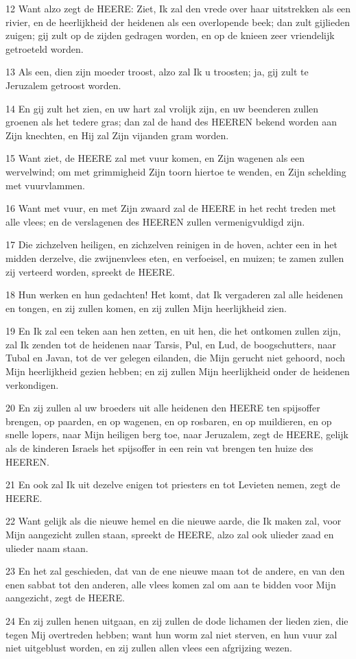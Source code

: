 \par 12 Want alzo zegt de HEERE: Ziet, Ik zal den vrede over haar uitstrekken als een rivier, en de heerlijkheid der heidenen als een overlopende beek; dan zult gijlieden zuigen; gij zult op de zijden gedragen worden, en op de knieen zeer vriendelijk getroeteld worden.
\par 13 Als een, dien zijn moeder troost, alzo zal Ik u troosten; ja, gij zult te Jeruzalem getroost worden.
\par 14 En gij zult het zien, en uw hart zal vrolijk zijn, en uw beenderen zullen groenen als het tedere gras; dan zal de hand des HEEREN bekend worden aan Zijn knechten, en Hij zal Zijn vijanden gram worden.
\par 15 Want ziet, de HEERE zal met vuur komen, en Zijn wagenen als een wervelwind; om met grimmigheid Zijn toorn hiertoe te wenden, en Zijn schelding met vuurvlammen.
\par 16 Want met vuur, en met Zijn zwaard zal de HEERE in het recht treden met alle vlees; en de verslagenen des HEEREN zullen vermenigvuldigd zijn.
\par 17 Die zichzelven heiligen, en zichzelven reinigen in de hoven, achter een in het midden derzelve, die zwijnenvlees eten, en verfoeisel, en muizen; te zamen zullen zij verteerd worden, spreekt de HEERE.
\par 18 Hun werken en hun gedachten! Het komt, dat Ik vergaderen zal alle heidenen en tongen, en zij zullen komen, en zij zullen Mijn heerlijkheid zien.
\par 19 En Ik zal een teken aan hen zetten, en uit hen, die het ontkomen zullen zijn, zal Ik zenden tot de heidenen naar Tarsis, Pul, en Lud, de boogschutters, naar Tubal en Javan, tot de ver gelegen eilanden, die Mijn gerucht niet gehoord, noch Mijn heerlijkheid gezien hebben; en zij zullen Mijn heerlijkheid onder de heidenen verkondigen.
\par 20 En zij zullen al uw broeders uit alle heidenen den HEERE ten spijsoffer brengen, op paarden, en op wagenen, en op rosbaren, en op muildieren, en op snelle lopers, naar Mijn heiligen berg toe, naar Jeruzalem, zegt de HEERE, gelijk als de kinderen Israels het spijsoffer in een rein vat brengen ten huize des HEEREN.
\par 21 En ook zal Ik uit dezelve enigen tot priesters en tot Levieten nemen, zegt de HEERE.
\par 22 Want gelijk als die nieuwe hemel en die nieuwe aarde, die Ik maken zal, voor Mijn aangezicht zullen staan, spreekt de HEERE, alzo zal ook ulieder zaad en ulieder naam staan.
\par 23 En het zal geschieden, dat van de ene nieuwe maan tot de andere, en van den enen sabbat tot den anderen, alle vlees komen zal om aan te bidden voor Mijn aangezicht, zegt de HEERE.
\par 24 En zij zullen henen uitgaan, en zij zullen de dode lichamen der lieden zien, die tegen Mij overtreden hebben; want hun worm zal niet sterven, en hun vuur zal niet uitgeblust worden, en zij zullen allen vlees een afgrijzing wezen.



